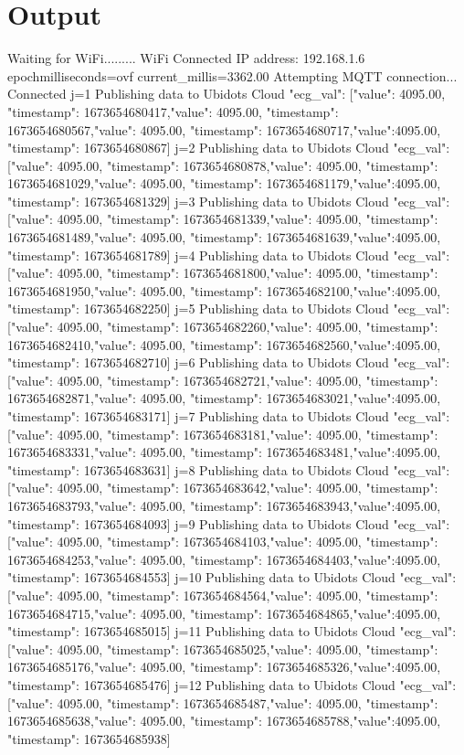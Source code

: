 \section{Output\label{output}}

\begin{commandshell}
  Waiting for WiFi.........
WiFi Connected
IP address:
192.168.1.6
epochmilliseconds=ovf
current_millis=3362.00
Attempting MQTT connection...
Connected
j=1
Publishing data to Ubidots Cloud
{"ecg_val": [{"value": 4095.00, "timestamp": 1673654680417},{"value": 4095.00, "timestamp": 1673654680567},{"value": 4095.00, "timestamp": 1673654680717},{"value":4095.00, "timestamp": 1673654680867}]}
j=2
Publishing data to Ubidots Cloud
{"ecg_val": [{"value": 4095.00, "timestamp": 1673654680878},{"value": 4095.00, "timestamp": 1673654681029},{"value": 4095.00, "timestamp": 1673654681179},{"value":4095.00, "timestamp": 1673654681329}]}
j=3
Publishing data to Ubidots Cloud
{"ecg_val": [{"value": 4095.00, "timestamp": 1673654681339},{"value": 4095.00, "timestamp": 1673654681489},{"value": 4095.00, "timestamp": 1673654681639},{"value":4095.00, "timestamp": 1673654681789}]}
j=4
Publishing data to Ubidots Cloud
{"ecg_val": [{"value": 4095.00, "timestamp": 1673654681800},{"value": 4095.00, "timestamp": 1673654681950},{"value": 4095.00, "timestamp": 1673654682100},{"value":4095.00, "timestamp": 1673654682250}]}
j=5
Publishing data to Ubidots Cloud
{"ecg_val": [{"value": 4095.00, "timestamp": 1673654682260},{"value": 4095.00, "timestamp": 1673654682410},{"value": 4095.00, "timestamp": 1673654682560},{"value":4095.00, "timestamp": 1673654682710}]}
j=6
Publishing data to Ubidots Cloud
{"ecg_val": [{"value": 4095.00, "timestamp": 1673654682721},{"value": 4095.00, "timestamp": 1673654682871},{"value": 4095.00, "timestamp": 1673654683021},{"value":4095.00, "timestamp": 1673654683171}]}
j=7
Publishing data to Ubidots Cloud
{"ecg_val": [{"value": 4095.00, "timestamp": 1673654683181},{"value": 4095.00, "timestamp": 1673654683331},{"value": 4095.00, "timestamp": 1673654683481},{"value":4095.00, "timestamp": 1673654683631}]}
j=8
Publishing data to Ubidots Cloud
{"ecg_val": [{"value": 4095.00, "timestamp": 1673654683642},{"value": 4095.00, "timestamp": 1673654683793},{"value": 4095.00, "timestamp": 1673654683943},{"value":4095.00, "timestamp": 1673654684093}]}
j=9
Publishing data to Ubidots Cloud
{"ecg_val": [{"value": 4095.00, "timestamp": 1673654684103},{"value": 4095.00, "timestamp": 1673654684253},{"value": 4095.00, "timestamp": 1673654684403},{"value":4095.00, "timestamp": 1673654684553}]}
j=10
Publishing data to Ubidots Cloud
{"ecg_val": [{"value": 4095.00, "timestamp": 1673654684564},{"value": 4095.00, "timestamp": 1673654684715},{"value": 4095.00, "timestamp": 1673654684865},{"value":4095.00, "timestamp": 1673654685015}]}
j=11
Publishing data to Ubidots Cloud
{"ecg_val": [{"value": 4095.00, "timestamp": 1673654685025},{"value": 4095.00, "timestamp": 1673654685176},{"value": 4095.00, "timestamp": 1673654685326},{"value":4095.00, "timestamp": 1673654685476}]}
j=12
Publishing data to Ubidots Cloud
{"ecg_val": [{"value": 4095.00, "timestamp": 1673654685487},{"value": 4095.00, "timestamp": 1673654685638},{"value": 4095.00, "timestamp": 1673654685788},{"value":4095.00, "timestamp": 1673654685938}]}
\end{commandshell}